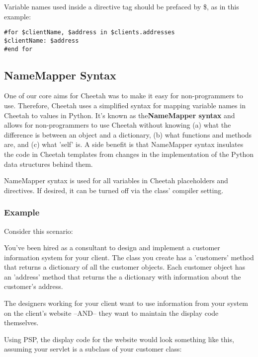 Variable names used inside a directive tag should be prefaced by \$, as in this
example:

\begin{verbatim}
#for $clientName, $address in $clients.addresses
$clientName: $address
#end for
\end{verbatim}


\subsection{NameMapper Syntax}
\label{language.namemapper}

One of our core aims for Cheetah was to make it easy for non-programmers to
use. Therefore, Cheetah uses a simplified syntax for mapping variable
names in Cheetah to values in Python. It's known as the{\bf NameMapper syntax}
and allows for non-programmers to use Cheetah without knowing (a)
what the difference is between an object and a dictionary, (b) what functions
and methods are, and (c) what 'self' is. A side benefit is that NameMapper
syntax insulates the code in Cheetah templates from changes in the implementation
of the Python data structures behind them.

NameMapper syntax is used for all variables in Cheetah placeholders and
directives. If desired, it can be turned off via the  class'
 compiler setting.

\subsubsection{Example}
\label{language.namemapper.example}

Consider this scenario:

You've been hired as a consultant to design and implement a customer information
system for your client. The class you create has a 'customers' method that
returns a dictionary of all the customer objects.  Each customer object has an
'address' method that returns the a dictionary with information about the
customer's address.

The designers working for your client want to use information from your system
on the client's website --AND-- they want to maintain the display code
themselves.

Using PSP, the display code for the website would look something like this,
assuming your servlet is a subclass of your customer class:


